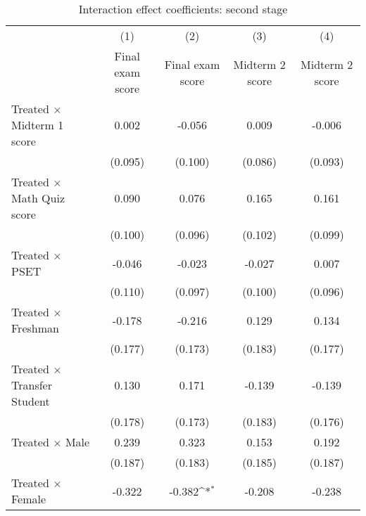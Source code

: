 \begin{table}[htbp] \centering \begin{threeparttable} \def\sym#1{\ifmmode^{#1}\else\(^{#1}\)\fi} \caption{Interaction effect coefficients: second stage} \begin{tabular}{l*{4}{c}} \toprule 
                    &\multicolumn{1}{c}{(1)}&\multicolumn{1}{c}{(2)}&\multicolumn{1}{c}{(3)}&\multicolumn{1}{c}{(4)}\\
                    &\multicolumn{1}{c}{Final exam score}&\multicolumn{1}{c}{Final exam score}&\multicolumn{1}{c}{Midterm 2 score}&\multicolumn{1}{c}{Midterm 2 score}\\
\midrule
Treated $\times$ Midterm 1 score&       0.002         &      -0.056         &       0.009         &      -0.006         \\
                    &     (0.095)         &     (0.100)         &     (0.086)         &     (0.093)         \\
[1em]
Treated $\times$ Math Quiz score&       0.090         &       0.076         &       0.165         &       0.161         \\
                    &     (0.100)         &     (0.096)         &     (0.102)         &     (0.099)         \\
[1em]
Treated $\times$ PSET&      -0.046         &      -0.023         &      -0.027         &       0.007         \\
                    &     (0.110)         &     (0.097)         &     (0.100)         &     (0.096)         \\
[1em]
Treated $\times$ Freshman&      -0.178         &      -0.216         &       0.129         &       0.134         \\
                    &     (0.177)         &     (0.173)         &     (0.183)         &     (0.177)         \\
[1em]
Treated $\times$ Transfer Student&       0.130         &       0.171         &      -0.139         &      -0.139         \\
                    &     (0.178)         &     (0.173)         &     (0.183)         &     (0.176)         \\
[1em]
Treated $\times$ Male&       0.239         &       0.323         &       0.153         &       0.192         \\
                    &     (0.187)         &     (0.183)         &     (0.185)         &     (0.187)         \\
[1em]
Treated $\times$ Female&      -0.322         &      -0.382\sym{*}  &      -0.208         &      -0.238         \\

\end{tabular}
\end{threeparttable}
\end{table}
